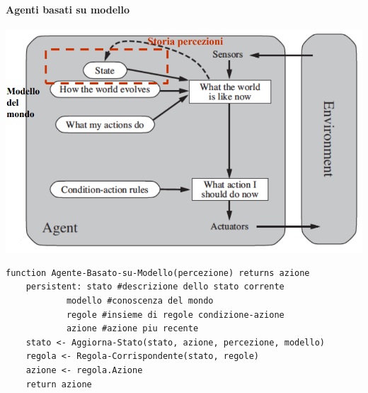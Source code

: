 \documentclass[10pt]{book}
\begin{document}
\paragraph{Agenti basati su modello}
\begin{center}
	\includegraphics[scale=0.5]{agmodello.png}
\end{center}
\begin{lstlisting}
function Agente-Basato-su-Modello(percezione) returns azione
	persistent:	stato #descrizione dello stato corrente
			modello #conoscenza del mondo
			regole #insieme di regole condizione-azione
			azione #azione piu recente
	stato <- Aggiorna-Stato(stato, azione, percezione, modello)
	regola <- Regola-Corrispondente(stato, regole)
	azione <- regola.Azione
	return azione
\end{lstlisting}
\pagebreak
\end{document}
